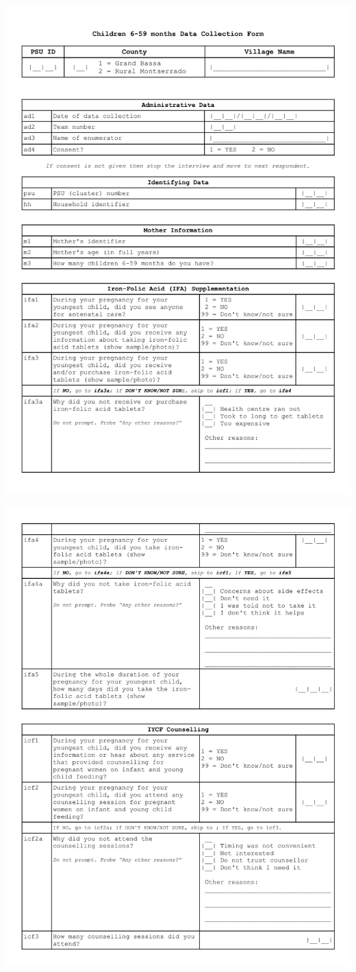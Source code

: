 \documentclass[12pt,a4paper]{article}
\begin{document}
\begin{center}\includegraphics[width=0.9\linewidth]{forms/childForm1} \end{center}

\begin{center}\includegraphics[width=0.9\linewidth]{forms/childForm2} \end{center}
\end{document}

